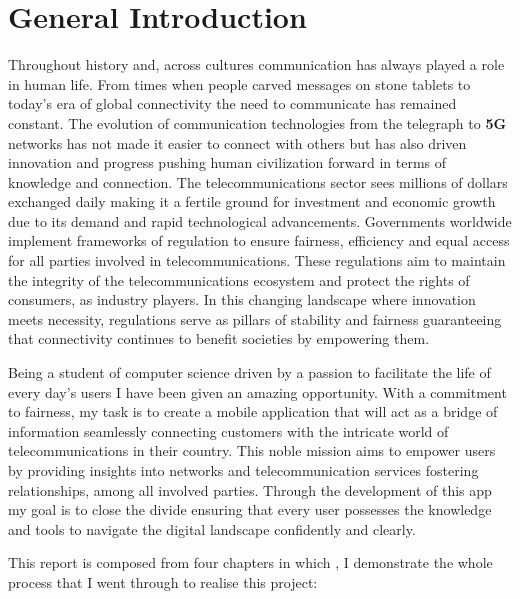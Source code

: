 
\chapter*{General Introduction}

\begin{large}
Throughout history and, across cultures communication has always played a role in human life. From times when people carved messages on stone tablets to today's era of global connectivity the need to communicate has remained constant. The evolution of communication technologies from the telegraph to \textbf{5G} networks has not made it easier to connect with others but has also driven innovation and progress pushing human civilization forward in terms of knowledge and connection. The telecommunications sector sees millions of dollars exchanged daily making it a fertile ground for investment and economic growth due to its demand and rapid technological advancements. Governments worldwide implement frameworks of regulation to ensure fairness, efficiency and equal access for all parties involved in telecommunications. These regulations aim to maintain the integrity of the telecommunications ecosystem and protect the rights of consumers, as industry players. In this changing landscape where innovation meets necessity, regulations serve as pillars of stability and fairness guaranteeing that connectivity continues to benefit societies by empowering them.


\vspace{0.5cm}

Being a student of computer science driven by a passion to facilitate the life of  every day's users I have been given an amazing opportunity. With a commitment to fairness, my task is to create a mobile application that will act as a bridge of information seamlessly connecting customers with the intricate world of telecommunications in their country. This noble mission aims to empower users by providing insights into networks and telecommunication  services fostering relationships, among all involved parties. Through the development of this app my goal is to close the divide ensuring that every user possesses the knowledge and tools to navigate the digital landscape confidently and clearly.


\vspace{0.5cm}

This report is composed from  four chapters in which , I demonstrate the whole process that I went through to realise this project:




\end{large}
